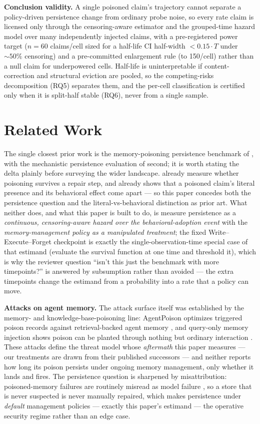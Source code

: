 \documentclass[11pt]{article}
\begin{document}
\textbf{Conclusion validity.} A single poisoned claim's trajectory cannot separate a policy-driven persistence change from ordinary probe noise, so every rate claim is licensed only through the censoring-aware estimator and the grouped-time hazard model over many independently injected claims, with a pre-registered power target ($n = 60$ claims/cell sized for a half-life CI half-width $< 0.15 \cdot T$ under ${\sim}50\%$ censoring) and a pre-committed enlargement rule (to 150/cell) rather than a null claim for underpowered cells. Half-life is uninterpretable if content-correction and structural eviction are pooled, so the competing-risks decomposition (RQ5) separates them, and the per-cell classification is certified only when it is split-half stable (RQ6), never from a single sample.

\section{Related Work}

The single closest prior work is the memory-poisoning persistence benchmark of \citet{chen2026memsecbench}, with the mechanistic persistence evaluation of \citet{leong2026injexec} second; it is worth stating the delta plainly before surveying the wider landscape. \citet{chen2026memsecbench} already measure whether poisoning survives a repair step, and \citet{leong2026injexec} already shows that a poisoned claim's literal presence and its behavioral effect come apart --- so this paper concedes both the persistence question and the literal-vs-behavioral distinction as prior art. What neither does, and what this paper is built to do, is measure persistence as a \emph{continuous, censoring-aware hazard over the behavioral-adoption event} with the \emph{memory-management policy as a manipulated treatment}; the fixed Write--Execute--Forget checkpoint is exactly the single-observation-time special case of that estimand (evaluate the survival function at one time and threshold it), which is why the reviewer question ``isn't this just the benchmark with more timepoints?'' is answered by subsumption rather than avoided --- the extra timepoints change the estimand from a probability into a rate that a policy can move.

\textbf{Attacks on agent memory.} The attack surface itself was established by the memory- and knowledge-base-poisoning line: AgentPoison optimizes triggered poison records against retrieval-backed agent memory \citep{chen2024agentpoison}, and query-only memory injection shows poison can be planted through nothing but ordinary interaction \citep{dong2025minja}. These attacks define the threat model whose \emph{aftermath} this paper measures --- our treatments are drawn from their published successors --- and neither reports how long its poison persists under ongoing memory management, only whether it lands and fires. The persistence question is sharpened by misattribution: poisoned-memory failures are routinely misread as model failure \citep{ahad2026misattribution}, so a store that is never suspected is never manually repaired, which makes persistence under \emph{default} management policies --- exactly this paper's estimand --- the operative security regime rather than an edge case.
\end{document}

